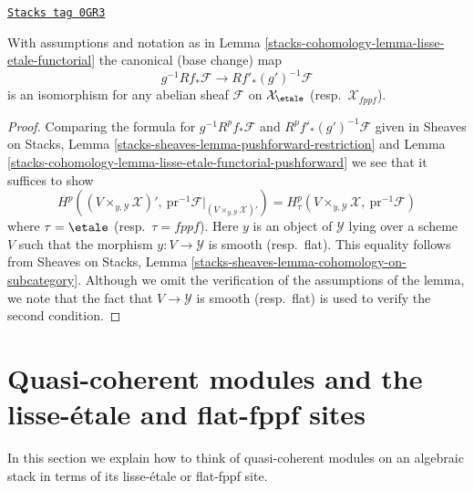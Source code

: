 \begin{lemma}
\label{stacks-cohomology-lemma-lisse-etale-functorial-cohomology}
\href{https://stacks.math.columbia.edu/tag/0GR3}{\texttt{Stacks tag 0GR3}}

With assumptions and notation as in Lemma \ref{stacks-cohomology-lemma-lisse-etale-functorial}
the canonical (base change) map
$$
g^{-1}Rf_*\mathcal{F} \longrightarrow Rf'_*(g')^{-1}\mathcal{F}
$$
is an isomorphism for any abelian sheaf $\mathcal{F}$
on $\mathcal{X}_\etale$ (resp.\ $\mathcal{X}_{fppf}$).
\end{lemma}

\begin{proof}
Comparing the formula for $g^{-1}R^pf_*\mathcal{F}$
and $R^pf'_*(g')^{-1}\mathcal{F}$ given in
Sheaves on Stacks, Lemma \ref{stacks-sheaves-lemma-pushforward-restriction}
and Lemma \ref{stacks-cohomology-lemma-lisse-etale-functorial-pushforward}
we see that it suffices to show
$$
H^p((V \times_{y, \mathcal{Y}} \mathcal{X})',
\ \text{pr}^{-1}\mathcal{F}|_{(V \times_{y, \mathcal{Y}} \mathcal{X})'})
=
H^p_\tau(V \times_{y, \mathcal{Y}} \mathcal{X},\ \text{pr}^{-1}\mathcal{F})
$$
where $\tau = \etale$ (resp.\ $\tau = fppf$). Here $y$ is an object
of $\mathcal{Y}$ lying over a scheme $V$ such that the morphism
$y : V \to \mathcal{Y}$ is smooth (resp.\ flat).
This equality follows from
Sheaves on Stacks, Lemma \ref{stacks-sheaves-lemma-cohomology-on-subcategory}.
Although we omit the verification of the assumptions
of the lemma, we note that the fact that $V \to \mathcal{Y}$ is smooth
(resp.\ flat) is used to verify the second condition.
\end{proof}

\section{Quasi-coherent modules and the lisse-\'etale and flat-fppf sites}
\label{stacks-cohomology-section-quasi-coherent-modules-II}
In this section we explain how to think of quasi-coherent modules
on an algebraic stack in terms of its lisse-\'etale or flat-fppf site.

